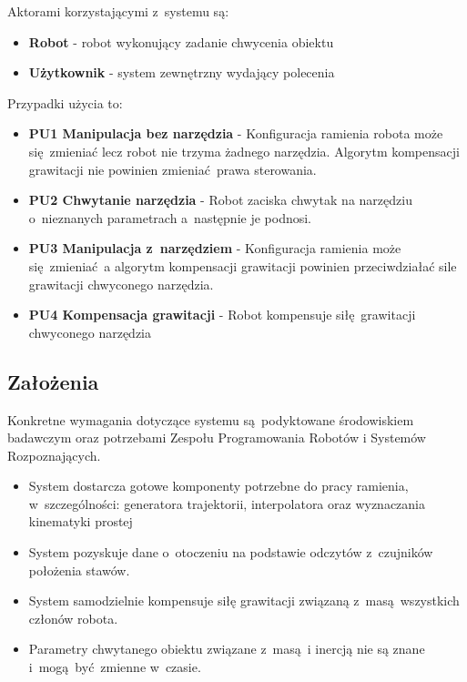 Aktorami korzystającymi z~systemu są:
\begin{itemize}
	\item \textbf{Robot} - robot wykonujący zadanie chwycenia obiektu
	\item \textbf{Użytkownik} - system zewnętrzny wydający polecenia
\end{itemize}


Przypadki użycia to:
\begin{itemize}
	\item \textbf{PU1 Manipulacja bez narzędzia} - Konfiguracja ramienia robota może się zmieniać lecz robot nie trzyma żadnego narzędzia. Algorytm kompensacji grawitacji nie powinien zmieniać prawa sterowania. 
	\item \textbf{PU2 Chwytanie narzędzia} - Robot zaciska chwytak na narzędziu o~nieznanych parametrach a~następnie je podnosi.  
	\item \textbf{PU3 Manipulacja z~narzędziem} - Konfiguracja ramienia może się zmieniać a algorytm kompensacji grawitacji powinien przeciwdziałać sile grawitacji chwyconego narzędzia.
	\item \textbf{PU4 Kompensacja grawitacji} - Robot kompensuje siłę grawitacji chwyconego narzędzia
\end{itemize}

\subsection{Założenia}
Konkretne wymagania dotyczące systemu są podyktowane środowiskiem badawczym oraz potrzebami Zespołu Programowania Robotów i Systemów Rozpoznających. 
\begin{itemize}
	\item System dostarcza gotowe komponenty potrzebne do pracy ramienia, w~szczególności: generatora trajektorii, interpolatora oraz wyznaczania kinematyki prostej 
	\item System pozyskuje dane o~otoczeniu na podstawie odczytów z~czujników położenia stawów.
	\item System samodzielnie kompensuje siłę grawitacji związaną z~masą wszystkich członów robota.
	\item Parametry chwytanego obiektu związane z~masą i inercją nie są znane i~mogą być zmienne w~czasie.
\end{itemize}

